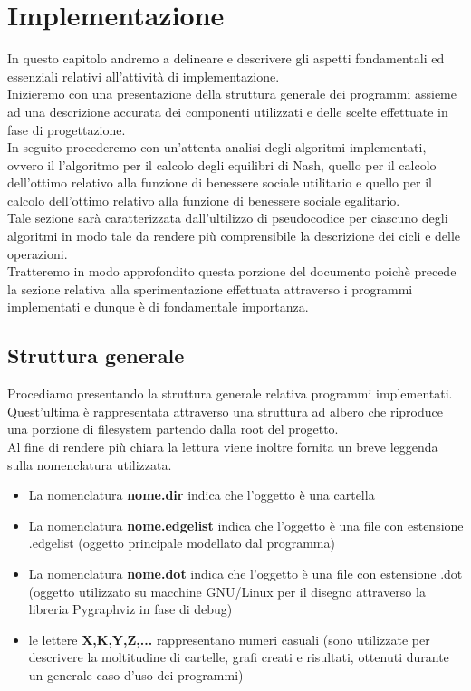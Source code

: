 \chapter{Implementazione}

In questo capitolo andremo a delineare e descrivere gli aspetti fondamentali ed essenziali relativi all'attività di implementazione.\\

Inizieremo con una presentazione della struttura generale dei programmi assieme ad una descrizione accurata dei componenti utilizzati e delle scelte effettuate in fase di progettazione.\\

In seguito procederemo con un'attenta analisi degli algoritmi implementati, ovvero il l'algoritmo per il calcolo degli equilibri di Nash, quello per il calcolo dell'ottimo relativo alla funzione di benessere sociale utilitario e quello per il calcolo dell'ottimo relativo alla funzione di benessere sociale egalitario.\\
Tale sezione sarà caratterizzata dall'ultilizzo di pseudocodice per ciascuno degli algoritmi in modo tale da rendere più comprensibile la descrizione dei cicli e delle operazioni.\\

Tratteremo in modo approfondito questa porzione del documento poichè precede la sezione relativa alla sperimentazione effettuata attraverso i programmi implementati e dunque è di fondamentale importanza.\\

\section{Struttura generale}
\justify

Procediamo presentando la struttura generale relativa programmi implementati.\\ 
Quest'ultima è rappresentata attraverso una struttura ad albero che riproduce una porzione di filesystem partendo dalla root del progetto.\\
Al fine di rendere più chiara la lettura viene inoltre fornita un breve leggenda sulla nomenclatura utilizzata.\\

\begin{itemize}
	\item La nomenclatura \textbf{nome.dir} indica che l'oggetto è una cartella
	\item La nomenclatura \textbf{nome.edgelist} indica che l'oggetto è una file con estensione .edgelist (oggetto principale modellato dal programma)
	\item La nomenclatura \textbf{nome.dot} indica che l'oggetto è una file con estensione .dot (oggetto utilizzato su macchine GNU/Linux per il disegno attraverso la libreria Pygraphviz in fase di debug)
	\item le lettere \textbf{X,K,Y,Z,...} rappresentano numeri casuali (sono utilizzate per descrivere la moltitudine di cartelle, grafi creati e risultati, ottenuti durante un generale caso d'uso dei programmi)
	
\end{itemize}

